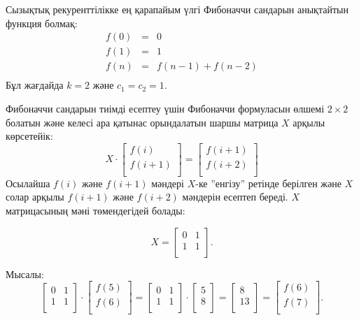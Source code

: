 
Сызықтық рекуренттілікке ең қарапайым үлгі 
Фибоначчи сандарын анықтайтын функция болмақ:
\[
\begin{array}{lcl}
f(0) & = & 0 \\
f(1) & = & 1 \\
f(n) & = & f(n-1)+f(n-2) \\
\end{array}
\]
Бұл жағдайда $k=2$ және $c_1=c_2=1$.

\begin{samepage}
Фибоначчи сандарын тиімді есептеу үшін
Фибоначчи формуласын өлшемі $2 \times 2$ 
болатын 
және келесі ара қатынас орындалатын
шаршы матрица $X$ арқылы көрсетейік:
\[ X \cdot
 \begin{bmatrix}
  f(i) \\
  f(i+1) \\
 \end{bmatrix}
=
 \begin{bmatrix}
  f(i+1) \\
  f(i+2) \\
 \end{bmatrix}
 \]
Осылайша $f(i)$ және $f(i+1)$ мәндері 
$X$-ке ''енгізу'' ретінде берілген және
$X$ солар арқылы $f(i+1)$ және $f(i+2)$ мәндерін
есептеп береді. $X$ матрицасының мәні төмендегідей болады:

\[ X = 
 \begin{bmatrix}
  0 & 1 \\
  1 & 1 \\
 \end{bmatrix}.
\]
\end{samepage}
\noindent
Мысалы:
\[
 \begin{bmatrix}
  0 & 1 \\
  1 & 1 \\
 \end{bmatrix}
\cdot
 \begin{bmatrix}
  f(5) \\
  f(6) \\
 \end{bmatrix}
=
 \begin{bmatrix}
  0 & 1 \\
  1 & 1 \\
 \end{bmatrix}
\cdot
 \begin{bmatrix}
  5 \\
  8 \\
 \end{bmatrix}
=
 \begin{bmatrix}
  8 \\
  13 \\
 \end{bmatrix}
=
 \begin{bmatrix}
  f(6) \\
  f(7) \\
 \end{bmatrix}.
\]

